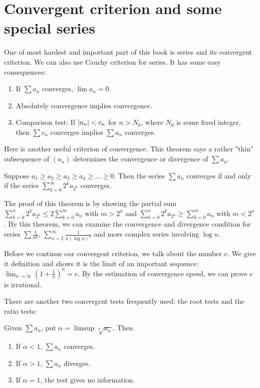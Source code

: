 \section{Convergent criterion and some special series}
One of most hardest and important part of this book is series and its convergent criterion. We can also use Cauchy criterion for series. It has some easy consequences:
\begin{enumerate}
    \item If $\sum a_n$ converges, $\lim a_n=0$.
    \item Absolutely convergence implies convergence.
    \item Comparison test: If $\left\lvert a_n\right\rvert<c_n$ for $n>N_0$, where $N_0$ is some fixed integer, then $\sum c_n$ converges implies $\sum a_n$ converges.
\end{enumerate}
Here is another useful criterion of convergence. This theorem says a rather "thin" subsequence of $(a_n)$ determines the convergence or divergence of $\sum a_n$.
\begin{theorem}[Theorem 3.27]
    Suppose $a_1\geq a_2\geq a_3\geq a_4\geq \dots \geq 0$. Then the series $\sum a_n$ converges if and only if the series $\sum_{k=0}^\infty 2^ka_{2^k}$ converges.
\end{theorem}
The proof of this theorem is by showing the partial sum $\sum_{k=0}^n 2^ka_{2^k}\leq 2\sum_{k=0}^m a_n$ with $m>2^n$ and $\sum_{k=0}^n 2^ka_{2^k}\geq\sum_{k=0}^m a_n$ with $m<2^n$. By this theorem, we can examine the convergence and divergence condition for series $\sum \frac{1}{n^p}$, $\sum_{n=2}^\infty \frac{1}{n(\log n)^p}$ and more complex series involving $\log n$.\par 
Before we continue our convergent criterion, we talk about the number $e$. We give it definition and shows it is the limit of an important sequence: $\lim_{n\to \infty}(1+\frac{1}{n})^n=e$. By the estimation of convergence speed, we can prove $e$ is irrational.\par
There are another two convergent tests frequently used: the root tests and the ratio tests:
\begin{theorem}
    Given $\sum a_n$, put $\alpha=\limsup\sqrt[n]{a_n}$. Then 
    \begin{enumerate}
        \item If $\alpha<1$, $\sum a_n$ converges.
        \item If $\alpha>1$, $\sum a_n$ diverges.
        \item If $\alpha=1$, the test gives no information.
    \end{enumerate}
\end{theorem}
